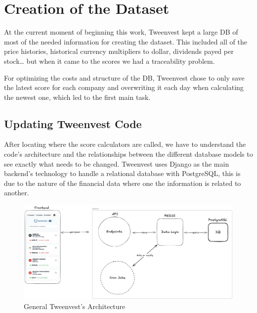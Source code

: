 \documentclass[11pt,english,a4paper,hidelinks]{book}
\begin{document}
\section{Creation of the Dataset}


\noindent At the current moment of beginning this work, Tweenvest kept a large DB of most of the needed information for creating the dataset. This included all of the price histories, historical currency multipliers to dollar, dividends payed per stock… but when it came to the scores we had a traceability problem.

\vspace{0.5cm}
\noindent For optimizing the costs and structure of the DB, Tweenvest chose to only save the latest score for each company and overwriting it each day when calculating the newest one, which led to the first main task.

\subsection{Updating Tweenvest Code}

After locating where the score calculators are called, we have to understand the code's architecture and the relationships between the different database models to see exactly what needs to be changed. Tweenvest uses Django as the main backend's technology to handle a relational database with PostgreSQL, this is due to the nature of the financial data where one the information is related to another.

\begin{figure}[H]
    \centering
    \includegraphics[width=1\textwidth]{images/tweenvest/general architecture.png}
    \caption{General Tweenvest's Architecture}
    \label{fig:general_architecture}
\end{figure}
\end{document}
